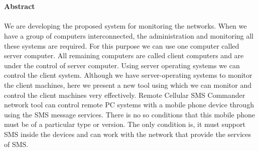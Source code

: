 \section*{}
\begin{center}
\textbf{\Large Abstract}
\end{center}
\paragraph{}
We are developing the proposed system for monitoring the networks. When we have a
group of computers interconnected, the administration and monitoring all these systems
are required. For this purpose we can use one computer called server computer. All
remaining computers are called client computers and are under the control of server
computer. Using server operating systems we can control  the client system. Although
we have server-operating systems to monitor the client machines, here we present a new
tool using which we can monitor and control the client machines very effectively. Remote
Cellular SMS Commander network tool can control remote PC systems with a mobile
phone device through using the SMS message services. There is no so conditions that
this mobile phone must be of a particular type or version. The only condition is, it must
support SMS inside the devices and can work with the network that provide the services
of SMS.
 



















